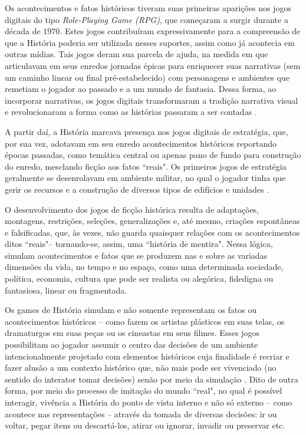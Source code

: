 Os acontecimentos e fatos históricos tiveram suas primeiras aparições nos jogos digitais do tipo \textit{Role-Playing Game (RPG)}, que começaram a surgir durante a década de $1970$. Estes jogos contribuíram expressivamente para a compreensão de que a História poderia ser utilizada nesses suportes, assim como já acontecia em outras mídias. Tais jogos deram sua parcela de ajuda, na medida em que articulavam em seus enredos jornadas épicas para enriquecer suas narrativas (sem um caminho linear ou final pré-estabelecido) com personagens e ambientes que remetiam o jogador ao passado e a um mundo de fantasia. Dessa forma, ao incorporar narrativas, os jogos digitais transformaram a tradição narrativa visual e revolucionaram a forma como as histórias passaram a ser contadas \cite{bib:novak2010}.

A partir daí, a História marcava presença nos jogos digitais de estratégia, que, por sua vez, adotavam em seu enredo acontecimentos históricos reportando épocas passadas, como temática central ou apenas pano de fundo para construção do enredo, mesclando ficção aos fatos ``reais". Os primeiros jogos de estratégia geralmente se desenrolavam em ambiente militar, no qual o jogador tinha que gerir os recursos e a construção de diversos tipos de edifícios e unidades \cite{bib:neves2012}.

O desenvolvimento dos jogos de ficção histórica resulta de adaptações, montagens, restrições, seleções, generalizações e, até mesmo, criações espontâneas e falsificadas, que, às vezes, não guarda quaisquer relações com os acontecimentos ditos ``reais"\space -- tornando-se, assim, uma ``história de mentira"\space \cite{bib:neves2012}. Nessa lógica, simulam acontecimentos e fatos que se produzem nas e sobre as variadas dimensões da vida, no tempo e no espaço, como uma determinada sociedade, política, economia, cultura que pode ser realista ou alegórica, fidedigna ou fantasiosa, linear ou fragmentada.

Os games de História simulam e não somente representam os fatos ou acontecimentos históricos -- como fazem os artistas plásticos em suas telas, os dramaturgos em suas peças ou os cineastas em seus filmes. Esses jogos possibilitam ao jogador assumir o centro das decisões de um ambiente intencionalmente projetado com elementos históricos cuja finalidade é recriar e fazer alusão a um contexto histórico que, não mais pode ser vivenciado (no sentido do interator tomar decisões) senão por meio da simulação \cite{bib:neves2012}. Dito de outra forma, por meio do processo de imitação do mundo ``real", no qual é possível interagir, vivência a História do ponto de vista interno e não só externo -- como acontece nas representações -- através da tomada de diversas decisões: ir ou voltar, pegar itens ou descartá-los, atirar ou ignorar, invadir ou preservar etc.

